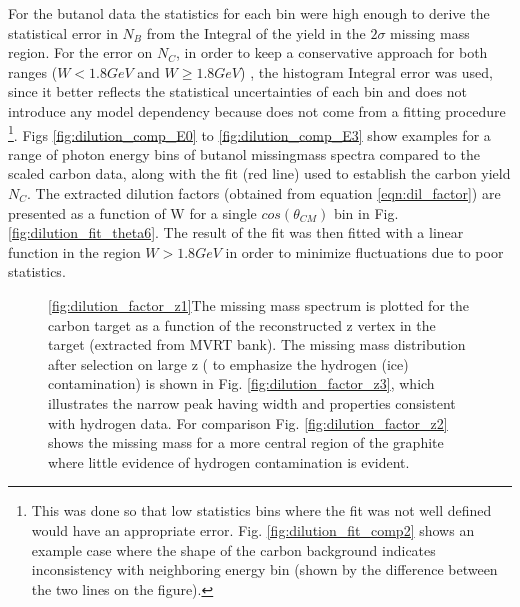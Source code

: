  For the butanol data the statistics for each bin were high enough to derive the statistical error in $N_B$ from the Integral of the yield in the $2\sigma$ missing mass region. For the error on $N_C$, in order to keep a conservative approach for both ranges ($W<1.8GeV$ and $W\geq 1.8GeV$) , the histogram Integral error was used, since it better reflects the statistical uncertainties of each bin and  does not introduce any model dependency because does not come from a fitting procedure \footnote{This was done so that low statistics bins where the fit was not well defined would have an appropriate error. Fig. \ref{fig:dilution_fit_comp2} shows an example case where the shape of the carbon background indicates inconsistency with neighboring energy bin (shown by the difference between the two lines on the figure). }. Figs \ref{fig:dilution_comp_E0} to \ref{fig:dilution_comp_E3} show examples for a range of photon energy bins  of butanol missingmass spectra  compared to the scaled carbon data, along with the fit (red line) used to establish the carbon yield $N_C$. The extracted dilution factors (obtained from equation \ref{eqn:dil_factor}) are presented as a function of W for a single $cos(\theta_{CM})$ bin in Fig. \ref{fig:dilution_fit_theta6}. The result of the fit was then fitted with a linear function in the region $W>1.8GeV$ in order to minimize fluctuations due to poor statistics.
 
\begin{figure}[H]
  \begin{center}
    \qquad
    \qquad

    \caption{\ref{fig:dilution_factor_z1}The missing mass spectrum is plotted for the carbon target as a function of the reconstructed z vertex in the target (extracted from MVRT bank). The missing mass distribution after selection on large z ( to emphasize the hydrogen (ice) contamination) is shown in Fig. \ref{fig:dilution_factor_z3}, which illustrates the narrow peak having width and properties consistent with hydrogen data. For comparison Fig.  \ref{fig:dilution_factor_z2}  shows the missing mass for a more central region of the graphite where little evidence of hydrogen contamination is evident.}
    \label{fig:dilution_factor_z0}
  \end{center}
\end{figure}

